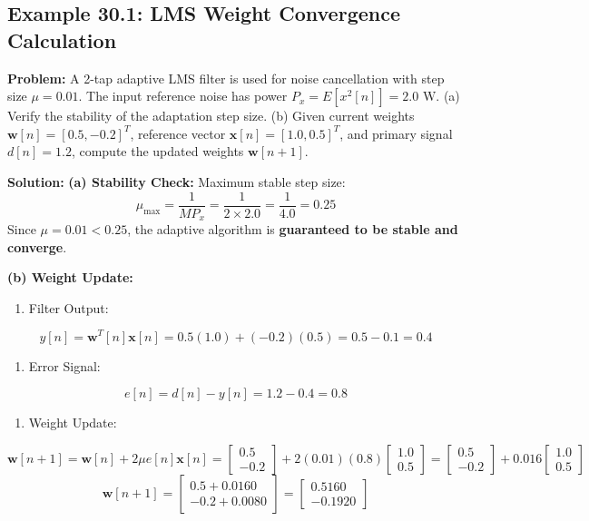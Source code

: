 \documentclass[11pt,a4paper]{article}
\begin{document}
\subsection*{Example 30.1: LMS Weight Convergence Calculation}
\textbf{Problem:} A 2-tap adaptive LMS filter is used for noise cancellation with step size $\mu = 0.01$. The input reference noise has power $P_x = E[x^2[n]] = 2.0\text{ W}$.
(a) Verify the stability of the adaptation step size.
(b) Given current weights $\mathbf{w}[n] = [0.5, -0.2]^T$, reference vector $\mathbf{x}[n] = [1.0, 0.5]^T$, and primary signal $d[n] = 1.2$, compute the updated weights $\mathbf{w}[n+1]$.

\textbf{Solution:}
\textbf{(a) Stability Check:}
Maximum stable step size:
$$ \mu_{\max} = \frac{1}{M P_x} = \frac{1}{2 \times 2.0} = \frac{1}{4.0} = 0.25 $$
Since $\mu = 0.01 < 0.25$, the adaptive algorithm is \textbf{guaranteed to be stable and converge}.

\textbf{(b) Weight Update:}
\begin{enumerate}
\item Filter Output:
\end{enumerate}
   $$ y[n] = \mathbf{w}^T[n] \mathbf{x}[n] = 0.5(1.0) + (-0.2)(0.5) = 0.5 - 0.1 = 0.4 $$
\begin{enumerate}
\item Error Signal:
\end{enumerate}
   $$ e[n] = d[n] - y[n] = 1.2 - 0.4 = 0.8 $$
\begin{enumerate}
\item Weight Update:
\end{enumerate}
   $$ \mathbf{w}[n+1] = \mathbf{w}[n] + 2\mu e[n] \mathbf{x}[n] = \begin{bmatrix} 0.5 \\ -0.2 \end{bmatrix} + 2(0.01)(0.8) \begin{bmatrix} 1.0 \\ 0.5 \end{bmatrix} = \begin{bmatrix} 0.5 \\ -0.2 \end{bmatrix} + 0.016 \begin{bmatrix} 1.0 \\ 0.5 \end{bmatrix} $$
   $$ \mathbf{w}[n+1] = \begin{bmatrix} 0.5 + 0.0160 \\ -0.2 + 0.0080 \end{bmatrix} = \begin{bmatrix} \mathbf{0.5160} \\ \mathbf{-0.1920} \end{bmatrix} $$
\end{document}
